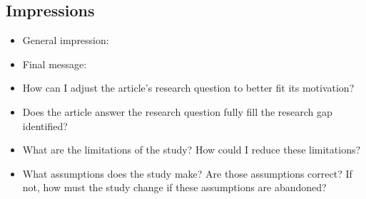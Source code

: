 \subsection{Impressions}

\begin{itemize}
    \item General impression:\cmt{
    \begin{itemize}
        \item 
    \end{itemize}
    }
    
    \item Final message:\cmt{
    \begin{itemize}
        \item 
    \end{itemize}
    }
    
    \item How can I adjust the article's research question to better fit its motivation?\cmt{
    \begin{itemize}
        \item 
    \end{itemize}
    }
    
    \item Does the article answer the research question fully fill the research gap identified?\cmt{
    \begin{itemize}
        \item 
    \end{itemize}
    }
    
    \item What are the limitations of the study? How could I reduce these limitations?\cmt{
    \begin{itemize}
        \item 
    \end{itemize}
    }
    
    \item What assumptions does the study make? Are those assumptions correct? If not, how must the study change if these assumptions are abandoned?\cmt{
    \begin{itemize}
        \item 
    \end{itemize}
    }
    
\end{itemize}